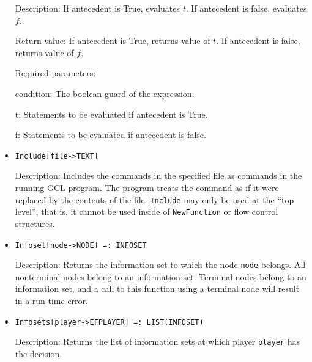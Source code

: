 \begin{itemize}
\bd
\item
[Description:] If antecedent is True, evaluates $t$.  If
antecedent is false, evaluates $f$. 
\item
[Return value:] If antecedent is True, returns value of $t$.  If
antecedent is false, returns value of $f$.  
\item
[Required parameters:]\hfil\null
\bd
\item
[condition:] The boolean guard of the expression.
\item
[t:] Statements to be evaluated if antecedent is True. 
\item
[f:] Statements to be evaluated if antecedent is false. 
\ed
\ed


\item
\protect \large \begin{verbatim}
Include[file->TEXT]
\end{verbatim}\normalsize

\bd
\item
[Description:] Includes the commands in the specified file as commands
in the running GCL program.  The program treats the command as if it
were replaced by the contents of the file.  \verb+Include+ may only be used
at the ``top level'', that is, it cannot be used inside of \verb+NewFunction+
or flow control structures.
\ed

\item
\protect \large \begin{verbatim}
Infoset[node->NODE] =: INFOSET
\end{verbatim}\normalsize

\bd
\item
[Description:] Returns the information set to which the node \verb+node+
belongs.  All nonterminal nodes belong to an information set.  Terminal
nodes belong to an information set, and a call to this function using
a terminal node will result in a run-time error.
\ed

\item
\protect \large \begin{verbatim}
Infosets[player->EFPLAYER] =: LIST(INFOSET)
\end{verbatim}\normalsize

\bd
\item
[Description:] Returns the list of information sets at which player
\verb+player+ has the decision.
\ed



\end{itemize}
